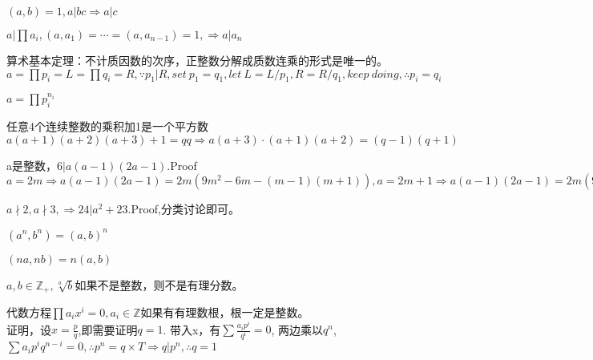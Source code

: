 \documentclass[UTF8]{../09-Mathematics}
\begin{document}
\begin{proposition}
    $  (a,b) = 1, a|bc \Rightarrow a|c  $
\end{proposition}

\begin{proposition}
    $ a| \prod a_i,  (a,a_1) = \cdots =(a,a_{n-1}) = 1, \Rightarrow a|a_n  $
\end{proposition}

\begin{proposition}
    算术基本定理：不计质因数的次序，正整数分解成质数连乘的形式是唯一的。
    $a =\prod p_i = L =  \prod q_i = R, \because p_1 | R, set \  p_1 = q_1, let \ L = L / p_1, R = R / q_1, keep \ doing, \therefore p_i = q_i  $

    $a =\prod p_i^{n_i}  $

\end{proposition}


\begin{proposition}
    任意4个连续整数的乘积加1是一个平方数$ a(a+1)(a+2)(a+3)+ 1 = qq \Rightarrow a(a+3) \cdot (a+1)(a+2)=(q-1)(q+1) $
\end{proposition}

\begin{proposition}
    a是整数，$6|a(a-1)(2a-1)$.Proof$a = 2m \Rightarrow a(a-1)(2a-1)=2m(9m^2 -6m-(m-1)(m+1)),a = 2m+1 \Rightarrow a(a-1)(2a-1)=2m(9m^2 +6m-(m-1)(m+1))  $
\end{proposition}

\begin{proposition}
    $ a\nmid 2 , a \nmid 3, \Rightarrow 24 | a^2+23$.Proof,分类讨论即可。
\end{proposition}

\begin{proposition}
    $ (a^n, b^n) = (a,b)^n$

    $ (na, nb) = n(a,b)$
\end{proposition}

\begin{proposition}
    $a,b \in \mathbb Z_+, \sqrt[a]{b}$如果不是整数，则不是有理分数。
\end{proposition}

\begin{proposition}
    代数方程$\prod a_ix^i = 0, a_i  \in \mathbb Z$如果有有理数根，根一定是整数。\\
    证明，设$x = \frac{p}{q}$,即需要证明$q = 1$. 带入x，有$\sum \frac{a_i p^i}{q^i} = 0$, 两边乘以$q^n$, $\sum a_i p^iq^{n-i} = 0, \therefore p^n = q \times T \Rightarrow q|p^n, \therefore q = 1$
\end{proposition}
\end{document}

